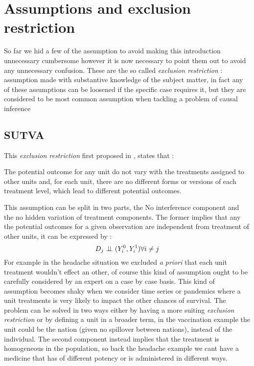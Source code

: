 \section{Assumptions and exclusion restriction}
So far we hid a few of the assumption to avoid making this introduction unnecessary cumbersome however it is now necessary to point them out to avoid any unnecessary confusion.
These are the so called \textit{exclusion  restriction} : assumption made with substantive knowledge of the subject matter, in fact any of these assumptions can be loosened if the specific case requires it, but they are considered to be most common assumption when tackling a problem of causal inference \citep{imbens2015causal}

\subsection{SUTVA}
This \textit{exclusion restriction} first proposed in  \citep{rubin1980randomization}, states that :
\begin{ass}
The potential outcome for any unit do not vary with the treatments assigned to other units and, for each unit, there are no different forms or versions of each treatment level, which lead to different potential outcomes.
\label{sutva}
\end{ass}
\citep{imbens2015causal}

This assumption can be split in two parts, the No interference component and the no hidden variation of treatment components. The former implies that any the potential outcomes for a given observation are independent from treatment of other units, it can be expressed by :
$$ D_j \perp\!\!\!\perp (Y^{0}_i,Y^{1}_i) \\ \forall i \not = j$$
For example in the headache situation we excluded \textit{a priori} that each unit treatment wouldn't effect an other, of course this kind of assumption ought to be carefully considered  by an expert on a case by case basis.
This kind of assumption becomes shaky when we consider time series or pandemics where a unit treatments is very likely to impact the other chances of survival. The problem can be solved in two ways either by having a more suiting \textit{exclusion restriction} or by defining a unit in a broader term, in the vaccination example the unit could be the nation (given no spillover between nations), instead of the individual. 
The second component instead implies that the treatment is homogeneous in the population, so back the headache example we cant have a medicine that has of different potency or is administered in different ways.

